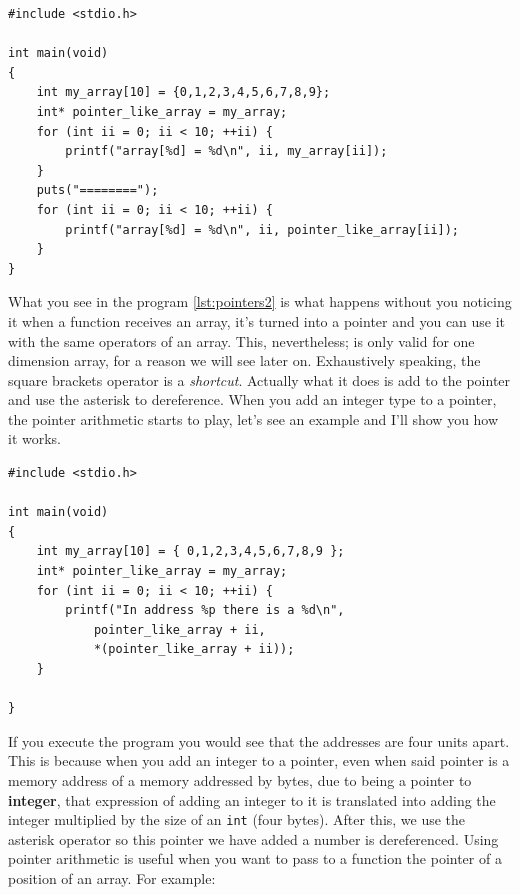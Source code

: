 \documentclass[a4paper]{article}
\begin{document}
\noindent
\begin{minipage}[H]{\linewidth}
\mbox{}
\begin{lstlisting}[style=C, label={lst:pointers2},
caption={Arrays as pointers}]
#include <stdio.h>

int main(void)
{
    int my_array[10] = {0,1,2,3,4,5,6,7,8,9};
    int* pointer_like_array = my_array;
    for (int ii = 0; ii < 10; ++ii) {
        printf("array[%d] = %d\n", ii, my_array[ii]);
    }
    puts("========");
    for (int ii = 0; ii < 10; ++ii) {
        printf("array[%d] = %d\n", ii, pointer_like_array[ii]);
    }
}
\end{lstlisting}
\end{minipage}

What you see in the program \ref{lst:pointers2} is what happens without
you noticing it when a function receives an array, it's turned into a pointer
and you can use it with the same operators of an array. This, nevertheless; is
only valid for one dimension array, for a reason we will see later on.
Exhaustively speaking, the square brackets operator is a \emph{shortcut}. Actually
what it does is add to the pointer and use the asterisk to dereference. When you
add an integer type to a pointer, the pointer arithmetic starts to play, let's
see an example and I'll show you how it works.

\noindent
\begin{minipage}[H]{\linewidth}
\mbox{}
\begin{lstlisting}[style=C, label={lst:pointers3},
caption={Aritmética de punteros}]
#include <stdio.h>

int main(void)
{
    int my_array[10] = { 0,1,2,3,4,5,6,7,8,9 };
    int* pointer_like_array = my_array;
    for (int ii = 0; ii < 10; ++ii) {
        printf("In address %p there is a %d\n",
            pointer_like_array + ii,
            *(pointer_like_array + ii));
    }

}
\end{lstlisting}
\end{minipage}

If you execute the program you would see that the addresses are four units
apart. This is because when you add an integer to a pointer, even when said
pointer is a memory address of a memory addressed by bytes, due to being a
pointer to \textbf{integer}, that expression of adding an integer to it is
translated into adding the integer multiplied by the size of an \verb!int!
(four bytes). After this, we use the asterisk operator so this pointer we have
added a number is dereferenced. Using pointer arithmetic is useful when
you want to pass to a function the pointer of a position of an array. For
example:
\end{document}
